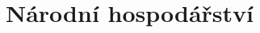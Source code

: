 \documentclass[ekobook.tex]{subfiles}
\begin{document}
\section{Národní hospodářství}
\end{document}
